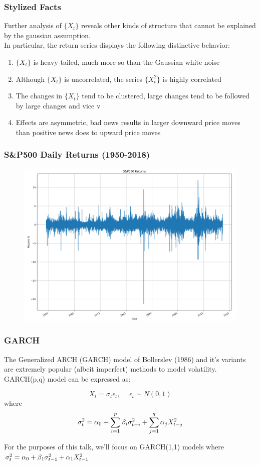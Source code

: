 \documentclass{beamer}
\begin{document}
\begin{frame}
\frametitle{Stylized Facts}
Further analysis of $\{X_t\}$ reveals other kinds of structure that cannot be explained by the gaussian assumption.\\
\vspace{0.5cm}
In particular, the return series displays the following distinctive behavior:

\begin{enumerate}
\item{$\{X_t\}$ is heavy-tailed, much more so than the Gaussian white noise}
\item{Although $\{X_t\}$ is uncorrelated, the series $\{X_{t}^2\}$ is highly correlated}
\item{The changes in $\{X_t\}$ tend to be clustered, large changes tend to be followed by large changes and vice v}
\item{Effects are asymmetric, bad news results in larger downward price moves than positive news does to upward price moves}
\end{enumerate}
\end{frame}

\begin{frame}
\frametitle{S\&P500 Daily Returns (1950-2018)}
\begin{figure}[h!]
\centering 
\includegraphics[width=\textwidth]{sp500_returns.png}
\end{figure}
\end{frame}


\begin{frame}
\frametitle{GARCH}
The Generalized ARCH (GARCH) model of Bollerslev (1986) and it's variants are extremely popular (albeit imperfect) methods to model volatility.\\
\vspace{15pt}
GARCH(p,q) model can be expressed as:

$$ X_t = \sigma_{t}\epsilon_{t}, \hspace{15pt} \epsilon_{t} \sim N(0,1) $$
where $$\sigma_{t}^{2} = \alpha_0 + \sum_{i=1}^{p} \beta_i \sigma_{t-i}^{2} + \sum_{j=1}^{q} \alpha_j X_{t-j}^{2}$$

For the purposes of this talk, we'll focus on GARCH(1,1) models where $\sigma_{t}^{2} = \alpha_0 + \beta_1 \sigma_{t-1}^{2} + \alpha_1 X_{t-1}^{2}$
\end{frame}
\end{document}
